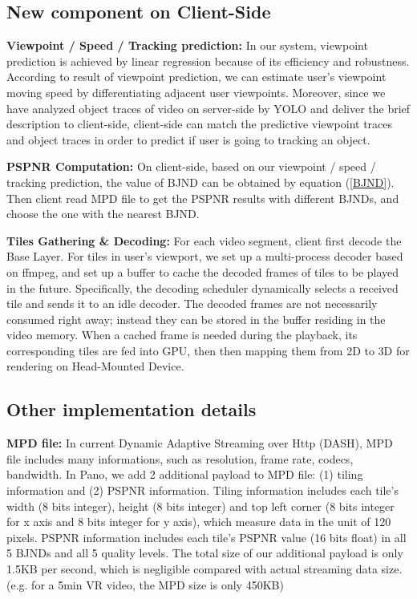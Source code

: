 \subsection{New component on Client-Side}

\textbf{Viewpoint / Speed / Tracking prediction:} In our system, viewpoint prediction is achieved by linear regression because of its efficiency and robustness. According to result of viewpoint prediction, we can estimate user's viewpoint moving speed by differentiating adjacent user viewpoints. Moreover, since we have analyzed object traces of video on server-side by YOLO \cite{yolo} and deliver the brief description to client-side, client-side can match the predictive viewpoint traces and object traces in order to predict if user is going to tracking an object.

\textbf{PSPNR Computation:} On client-side, based on our viewpoint / speed / tracking prediction, the value of BJND can be obtained by equation (\ref{BJND}). Then client read MPD file to get the PSPNR results with different BJNDs, and choose the one with the nearest BJND.

\textbf{Tiles Gathering \& Decoding:} For each video segment, client first decode the Base Layer. For tiles in user's viewport, we set up a multi-process decoder based on ffmpeg, and set up a buffer to cache the decoded frames of tiles to be played in the future. Specifically, the decoding scheduler dynamically selects a received tile and sends it to an idle decoder. The decoded frames are not necessarily consumed right away; instead they can be stored in the buffer residing in the video memory. When a cached frame is needed during the playback, its corresponding tiles are fed into GPU, then then mapping them from 2D to 3D for rendering on Head-Mounted Device.

\subsection{Other implementation details}
\textbf{MPD file: } In current Dynamic Adaptive Streaming over Http (DASH), MPD file includes many informations, such as resolution, frame rate, codecs, bandwidth. In Pano, we add 2 additional payload to MPD file: (1) tiling information and (2) PSPNR information. Tiling information includes each tile's width (8 bits integer), height (8 bits integer) and top left corner (8 bits integer for x axis and 8 bits integer for y axis), which measure data in the unit of 120 pixels. PSPNR information includes each tile's PSPNR value (16 bits float) in all 5 BJNDs and all 5 quality levels. The total size of our additional payload is only 1.5KB per second, which is negligible compared with actual streaming data size. (e.g. for a 5min VR video, the MPD size is only 450KB)

